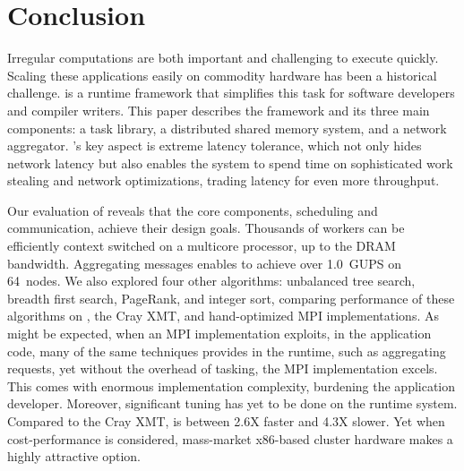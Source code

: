 \section{Conclusion}

Irregular computations are both important and challenging to execute
quickly.  Scaling these applications easily on commodity hardware has
been a historical challenge. \Grappa is a runtime framework that
simplifies this task for software developers and compiler
writers. This paper describes the \Grappa framework and its three main
components: a task library, a distributed shared memory system, and a
network aggregator. \Grappa's key aspect is extreme latency tolerance,
which not only hides network latency but also enables the system to
spend time on sophisticated work stealing and network optimizations,
trading latency for even more throughput.

Our evaluation of \Grappa reveals that the core components, scheduling
and communication, achieve their design goals.  Thousands of workers
can be efficiently context switched on a multicore processor, up to
the DRAM bandwidth.  Aggregating messages enables \Grappa to achieve
over 1.0~GUPS on 64~nodes.  We also explored four other algorithms:
unbalanced tree search, breadth first search, PageRank, and integer
sort, comparing performance of these algorithms on \Grappa, the Cray
XMT, and hand-optimized MPI implementations.  As might be expected,
when an MPI implementation exploits, in the application code, many of the
same techniques \Grappa provides in the runtime, such as aggregating
requests, yet without the overhead of tasking, the MPI implementation
excels.  This comes with enormous implementation complexity, burdening
the application developer. Moreover, significant tuning has yet to be
done on the \Grappa runtime system.  Compared to the Cray XMT, \Grappa
is between 2.6X faster and 4.3X slower.  Yet when cost-performance is
considered, mass-market x86-based cluster hardware makes \Grappa a
highly attractive option.
